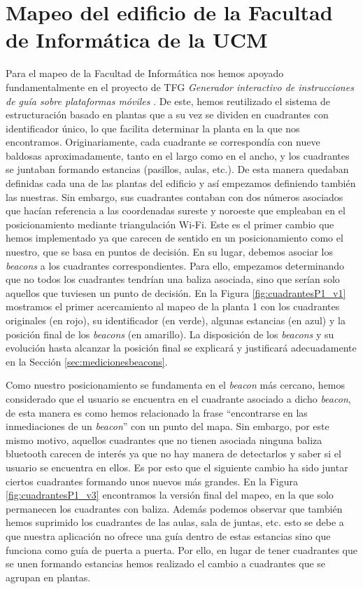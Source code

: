 \section{Mapeo del edificio de la Facultad de Informática de la UCM}
\label{sec:mapeo}

Para el mapeo de la Facultad de Informática nos hemos apoyado fundamentalmente en el proyecto de TFG \textit{Generador interactivo de instrucciones de guía sobre plataformas móviles} \citep{TFGguia}. De este, hemos reutilizado el sistema de estructuración basado en plantas que a su vez se dividen en cuadrantes con identificador único, lo que facilita determinar la planta en la que nos encontramos.
Originariamente, cada cuadrante se correspondía con nueve baldosas aproximadamente, tanto en el largo como en el ancho, y los cuadrantes se juntaban formando estancias (pasillos, aulas, etc.). De esta manera quedaban definidas cada una de las plantas del edificio y así empezamos definiendo también las nuestras. Sin embargo, sus cuadrantes contaban con dos números asociados que hacían referencia a las coordenadas sureste y noroeste que empleaban en el posicionamiento mediante triangulación Wi-Fi. Este es el primer cambio que hemos implementado ya que carecen de sentido en un posicionamiento como el nuestro, que se basa en puntos de decisión. En su lugar, debemos asociar los \textit{beacons} a los cuadrantes correspondientes. Para ello, empezamos determinando que no todos los cuadrantes tendrían una baliza asociada, sino que serían solo aquellos que tuviesen un punto de decisión. En la Figura \ref{fig:cuadrantesP1_v1} mostramos el primer acercamiento al mapeo de la planta 1 con los cuadrantes originales (en rojo), su identificador (en verde), algunas estancias (en azul) y la posición final de los \textit{beacons} (en amarillo). La disposición de los \textit{beacons} y su evolución hasta alcanzar la posición final se explicará y justificará adecuadamente en la Sección \ref{sec:medicionesbeacons}.

Como nuestro posicionamiento se fundamenta en el \textit{beacon} más cercano, hemos considerado que el usuario se encuentra en el cuadrante asociado a dicho \textit{beacon}, de esta manera es como hemos relacionado la frase ``encontrarse en las inmediaciones de un \textit{beacon}'' con un punto del mapa. Sin embargo, por este mismo motivo, aquellos cuadrantes que no tienen asociada ninguna baliza bluetooth carecen de interés ya que no hay manera de detectarlos y saber si el usuario se encuentra en ellos. Es por esto que el siguiente cambio ha sido juntar ciertos cuadrantes formando unos nuevos más grandes. En la Figura \ref{fig:cuadrantesP1_v3} encontramos la versión final del mapeo, en la que solo permanecen los cuadrantes con baliza. Además podemos observar que también hemos suprimido los cuadrantes de las aulas, sala de juntas, etc. esto se debe a que nuestra aplicación no ofrece una guía dentro de estas estancias sino que funciona como guía de puerta a puerta. Por ello, en lugar de tener cuadrantes que se unen formando estancias hemos realizado el cambio a cuadrantes que se agrupan en plantas.

